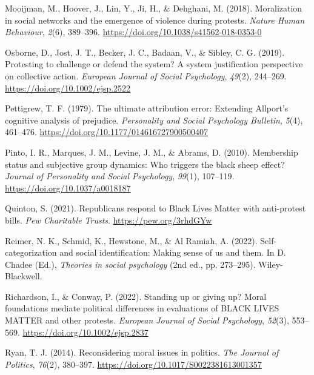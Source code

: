 \documentclass[12pt, letterpaper]{article}
\newenvironment{CSLReferences}[2]{}{}
\begin{document}
\begin{CSLReferences}{1}{0}
\leavevmode{}%
Mooijman, M., Hoover, J., Lin, Y., Ji, H., \& Dehghani, M. (2018).
Moralization in social networks and the emergence of violence during
protests. \emph{Nature Human Behaviour}, \emph{2}(6), 389--396.
\url{https://doi.org/10.1038/s41562-018-0353-0}

\leavevmode{}%
Osborne, D., Jost, J. T., Becker, J. C., Badaan, V., \& Sibley, C. G.
(2019). Protesting to challenge or defend the system? {A} system
justification perspective on collective action. \emph{European Journal
of Social Psychology}, \emph{49}(2), 244--269.
\url{https://doi.org/10.1002/ejsp.2522}

\leavevmode{}%
Pettigrew, T. F. (1979). The ultimate attribution error: Extending
{Allport}'s cognitive analysis of prejudice. \emph{Personality and
Social Psychology Bulletin}, \emph{5}(4), 461--476.
\url{https://doi.org/10.1177/014616727900500407}

\leavevmode{}%
Pinto, I. R., Marques, J. M., Levine, J. M., \& Abrams, D. (2010).
Membership status and subjective group dynamics: Who triggers the black
sheep effect? \emph{Journal of Personality and Social Psychology},
\emph{99}(1), 107--119. \url{https://doi.org/10.1037/a0018187}

\leavevmode{}%
Quinton, S. (2021). Republicans respond to {Black Lives Matter} with
anti-protest bills. \emph{Pew Charitable Trusts}.
\url{https://pew.org/3rhdGYw}

\leavevmode{}%
Reimer, N. K., Schmid, K., Hewstone, M., \& Al Ramiah, A. (2022).
Self-categorization and social identification: Making sense of us and
them. In D. Chadee (Ed.), \emph{Theories in social psychology} (2nd ed.,
pp. 273--295). Wiley-Blackwell.

\leavevmode{}%
Richardson, I., \& Conway, P. (2022). Standing up or giving up? {Moral}
foundations mediate political differences in evaluations of {BLACK}
{LIVES} {MATTER} and other protests. \emph{European Journal of Social
Psychology}, \emph{52}(3), 553--569.
\url{https://doi.org/10.1002/ejsp.2837}

\leavevmode{}%
Ryan, T. J. (2014). Reconsidering moral issues in politics. \emph{The
Journal of Politics}, \emph{76}(2), 380--397.
\url{https://doi.org/10.1017/S0022381613001357}


\end{CSLReferences}
\end{document}
